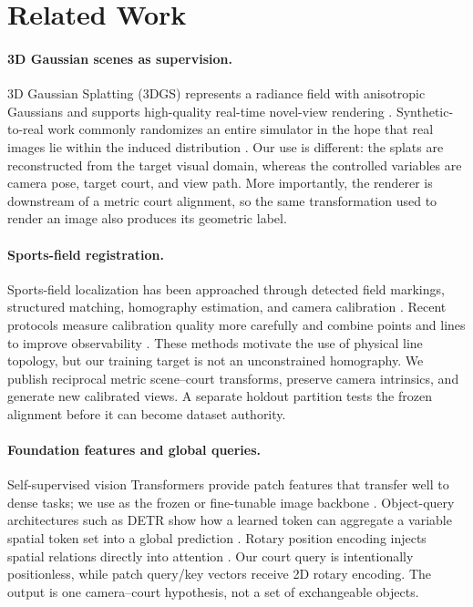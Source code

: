 \section{Related Work}
\label{sec:related_work}

\paragraph{3D Gaussian scenes as supervision.}
3D Gaussian Splatting (3DGS) represents a radiance field with anisotropic
Gaussians and supports high-quality real-time novel-view rendering
\citep{kerbl2023gaussian}.  Synthetic-to-real work commonly randomizes an
entire simulator in the hope that real images lie within the induced
distribution \citep{tobin2017domain}.  Our use is different: the splats are
reconstructed from the target visual domain, whereas the controlled variables
are camera pose, target court, and view path.  More importantly, the renderer
is downstream of a metric court alignment, so the same transformation used to
render an image also produces its geometric label.

\paragraph{Sports-field registration.}
Sports-field localization has been approached through detected field markings,
structured matching, homography estimation, and camera calibration
\citep{homayounfar2017sports}.  Recent protocols measure calibration quality
more carefully and combine points and lines to improve observability
\citep{magera2024procc,gutierrez2026pnlcalib}.  These methods motivate the use
of physical line topology, but our training target is not an unconstrained
homography.  We publish reciprocal metric scene--court transforms, preserve
camera intrinsics, and generate new calibrated views.  A separate holdout
partition tests the frozen alignment before it can become dataset authority.

\paragraph{Foundation features and global queries.}
Self-supervised vision Transformers provide patch features that transfer well
to dense tasks; we use \DINO{} as the frozen or fine-tunable image backbone
\citep{simeoni2025dinov3}.  Object-query architectures such as DETR show how a
learned token can aggregate a variable spatial token set into a global
prediction \citep{carion2020detr}.  Rotary position encoding injects spatial
relations directly into attention \citep{su2021roformer}.  Our court query is
intentionally positionless, while patch query/key vectors receive 2D rotary
encoding.  The output is one camera--court hypothesis, not a set of exchangeable
objects.

